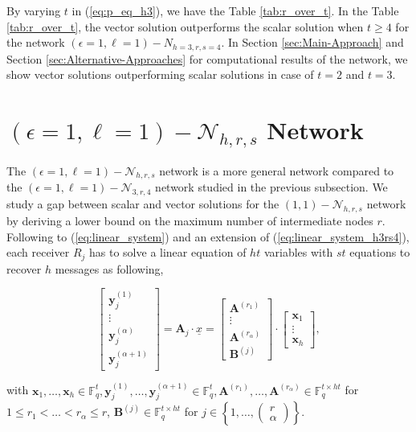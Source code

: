 By varying $t$ in (\ref{eq:p_eq_h3}), we have the Table \ref{tab:r_over_t}.
In the Table \ref{tab:r_over_t}, the vector solution outperforms
the scalar solution when $t\geq4$ for the network $\left(\epsilon=1,\ell=1\right)-\ensuremath{N}_{h=3,r,s=4}$.
In Section \ref{sec:Main-Approach} and Section \ref{sec:Alternative-Approaches}
for computational results of the network, we show vector solutions
outperforming scalar solutions in case of $t=2$ and $t=3$.

\section{$\left(\epsilon=1,\ell=1\right)-\mathcal{N}_{h,r,s}$ Network \label{sec:e1l1_nw}}

The $\left(\epsilon=1,\ell=1\right)-\mathcal{N}_{h,r,s}$ network
is a more general network compared to the $\left(\epsilon=1,\ell=1\right)-\mathcal{N}_{3,r,4}$
network studied in the previous subsection. We study a gap between
scalar and vector solutions for the $\left(1,1\right)-\mathcal{N}_{h,r,s}$
network by deriving a lower bound on the maximum number of intermediate
nodes $r$. Following to (\ref{eq:linear_system}) and an extension
of (\ref{eq:linear_system_h3rs4}), each receiver $R_{j}$ has to
solve a linear equation of $ht$ variables with $st$ equations to
recover $h$ messages as following,

\[
\left[\begin{array}{c}
\boldsymbol{y}_{j}^{\left(1\right)}\\
\vdots\\
\boldsymbol{y}_{j}^{\left(\alpha\right)}\\
\boldsymbol{y}_{j}^{\left(\alpha+1\right)}
\end{array}\right]=\boldsymbol{A}_{j}\cdot\underline{x}=\left[\begin{array}{c}
\boldsymbol{A}^{\left(r_{1}\right)}\\
\vdots\\
\boldsymbol{A}^{\left(r_{\alpha}\right)}\\
\boldsymbol{B}^{\left(j\right)}
\end{array}\right]\cdot\left[\begin{array}{c}
\boldsymbol{x}_{1}\\
\vdots\\
\boldsymbol{x}_{h}
\end{array}\right],
\]

with $\boldsymbol{x}_{1},\ldots,\boldsymbol{x}_{h}\in\ensuremath{\mathbb{F}}_{q}^{t},\boldsymbol{y}_{j}^{\left(1\right)},\ldots,\boldsymbol{y}_{j}^{\left(\alpha+1\right)}\in\ensuremath{\mathbb{F}}_{q}^{t},\boldsymbol{A}^{\left(r_{1}\right)},\ldots,\boldsymbol{A}^{\left(r_{\alpha}\right)}\in\ensuremath{\mathbb{F}}_{q}^{t\times ht}$
for $1\leq r_{1}<\ldots<r_{\alpha}\leq r$, $\boldsymbol{B}^{\left(j\right)}\in\ensuremath{\mathbb{F}}_{q}^{t\times ht}$
for $j\in\left\{ 1,\ldots,\left(\begin{array}{c}
r\\
\alpha
\end{array}\right)\right\} $.

